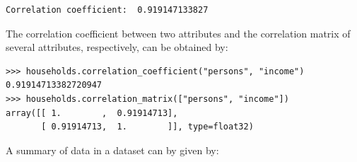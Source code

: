 \begin{center}
\end{center}
\coefficientsindex
\begin{verbatim}
Correlation coefficient:  0.919147133827
\end{verbatim}

The correlation coefficient between two attributes and the correlation matrix of several attributes, respectively,
can be obtained by:
\begin{verbatim}
>>> households.correlation_coefficient("persons", "income")
0.91914713382720947
>>> households.correlation_matrix(["persons", "income"])
array([[ 1.        ,  0.91914713],
       [ 0.91914713,  1.        ]], type=float32)
\end{verbatim}

A summary of data in a dataset \datasetindex can by given by:

